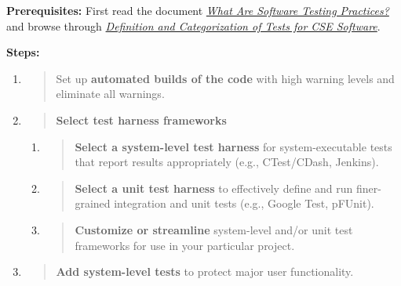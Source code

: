 \documentclass[]{article}
\begin{document}
\textbf{Prerequisites:} First read the document
\href{http://ideas-productivity.org/wordpress/wp-content/uploads/2016/04/IDEAS-TestingWhatAreSoftwareTestingPractices-V0.2.pdf}{\emph{What
Are Software Testing Practices?}} and browse through
\href{http://ideas-productivity.org/wordpress/wp-content/uploads/2016/04/IDEAS-TestingWhatIsDefinitionandCategorizationofTestsforCSESoftware-V0.2.pdf}{\emph{Definition
and Categorization of Tests for CSE Software}}.

\textbf{Steps:}

\begin{enumerate}
\def\labelenumi{\arabic{enumi}.}
\item
  \begin{quote}
  Set up \textbf{automated builds of the code} with high warning levels
  and eliminate all warnings.
  \end{quote}
\item
  \begin{quote}
  \textbf{Select test harness frameworks}
  \end{quote}

  \begin{enumerate}
  \def\labelenumii{\alph{enumii}.}
  \item
    \begin{quote}
    \textbf{Select a system-level test harness} for system-executable
    tests that report results appropriately (e.g., CTest/CDash,
    Jenkins).
    \end{quote}
  \item
    \begin{quote}
    \textbf{Select a unit test harness} to effectively define and run
    finer-grained integration and unit tests (e.g., Google Test,
    pFUnit).
    \end{quote}
  \item
    \begin{quote}
    \textbf{Customize or streamline} system-level and/or unit test
    frameworks for use in your particular project.
    \end{quote}
  \end{enumerate}
\item
  \begin{quote}
  \textbf{Add system-level tests} to protect major user functionality.
  \end{quote}


\end{enumerate}
\end{document}
